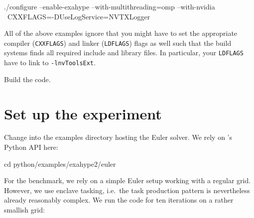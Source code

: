 \begin{code}
 ./configure --enable-exahype --with-multithreading=omp --with-nvidia \
   CXXFLAGS=-DUseLogService=NVTXLogger
\end{code}

\noindent
All of the above examples ignore that you might have to set the appropriate
compiler (\texttt{CXXFLAGS}) and linker (\texttt{LDFLAGS}) flags as well such
that the build systems finds all required include and library files.
In particular, your \texttt{LDFLAGS} have to link to \texttt{-lnvToolsExt}.


Build the code.


\section{Set up the experiment}

Change into the examples directory hosting the Euler solver.
We rely on \Peano's Python API here:

\begin{code}
cd python/examples/exahype2/euler
\end{code}

\noindent
For the benchmark, we rely on a simple Euler setup working with a regular grid.
However, we use enclave tasking, i.e.~the task production pattern is
nevertheless already reasonably complex.
We run the code for ten iterations on a rather smallish grid:

